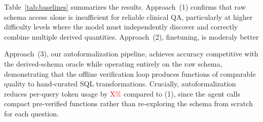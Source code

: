 \begin{table}[t]
\centering
\caption{Comparison of QA approaches across all 63 concepts on the held-out test set. Accuracy is macro-averaged across concepts. Token usage and time are reported per question at inference. \textcolor{red}{[TODO: Fill in all cells. Add a row for ``Human Expert'' if available. Consider adding F1 for binary questions in addition to accuracy.]}}
\label{tab:baselines}
\end{table}

Table~\ref{tab:baselines} summarizes the results.
Approach~(1) confirms that raw schema access alone is insufficient for reliable clinical QA, particularly at higher difficulty levels where the model must independently discover and correctly combine multiple derived quantities.
Approach~(2), finetuning, is moderaly better

Approach~(3), our autoformalization pipeline, achieves accuracy competitive with the derived-schema oracle while operating entirely on the raw schema, demonstrating that the offline verification loop produces functions of comparable quality to hand-curated SQL transformations.
Crucially, autoformalization reduces per-query token usage by \textcolor{red}{X\%} compared to (1), since the agent calls compact pre-verified functions rather than re-exploring the schema from scratch for each question.












